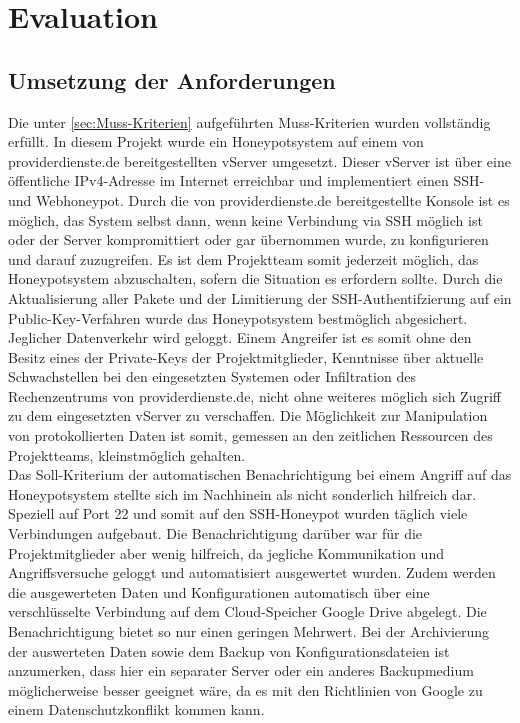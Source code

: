 \chapter{Evaluation}
\label{ch:Evaluation}

\section{Umsetzung der Anforderungen}
\label{sec:Umsetzung der Anforderungen}

Die unter \ref{sec:Muss-Kriterien} aufgeführten Muss-Kriterien wurden vollständig erfüllt. In diesem Projekt wurde ein Honeypotsystem auf einem von providerdienste.de bereitgestellten vServer umgesetzt. Dieser vServer ist über eine öffentliche IPv4-Adresse im Internet erreichbar und implementiert einen SSH- und Webhoneypot. Durch die von providerdienste.de bereitgestellte Konsole ist es möglich, das System selbst dann, wenn keine Verbindung via SSH möglich ist oder der Server kompromittiert oder gar übernommen wurde, zu konfigurieren und darauf zuzugreifen. Es ist dem Projektteam somit jederzeit möglich, das Honeypotsystem abzuschalten, sofern die Situation es erfordern sollte. Durch die Aktualisierung aller Pakete und der Limitierung der SSH-Authentifzierung auf ein Public-Key-Verfahren wurde das Honeypotsystem bestmöglich abgesichert. Jeglicher Datenverkehr wird geloggt. Einem Angreifer ist es somit ohne den Besitz eines der Private-Keys der Projektmitglieder, Kenntnisse über aktuelle Schwachstellen bei den eingesetzten Systemen oder Infiltration des Rechenzentrums von providerdienste.de, nicht ohne weiteres möglich sich Zugriff zu dem eingesetzten vServer zu verschaffen. Die Möglichkeit zur Manipulation von protokollierten Daten ist somit, gemessen an den zeitlichen Ressourcen des Projektteams, kleinstmöglich gehalten.\\

Das Soll-Kriterium der automatischen Benachrichtigung bei einem Angriff auf das Honeypotsystem stellte sich im Nachhinein als nicht sonderlich hilfreich dar. Speziell auf Port 22 und somit auf den SSH-Honeypot wurden täglich viele Verbindungen aufgebaut. Die Benachrichtigung darüber war für die Projektmitglieder aber wenig hilfreich, da jegliche Kommunikation und Angriffsversuche geloggt und automatisiert ausgewertet wurden. Zudem werden die ausgewerteten Daten und Konfigurationen automatisch über eine verschlüsselte Verbindung auf dem Cloud-Speicher Google Drive abgelegt. Die Benachrichtigung bietet so nur einen geringen Mehrwert. Bei der Archivierung der auswerteten Daten sowie dem Backup von Konfigurationsdateien ist anzumerken, dass hier ein separater Server oder ein anderes Backupmedium möglicherweise besser geeignet wäre, da es mit den Richtlinien von Google zu einem Datenschutzkonflikt kommen kann.\\

